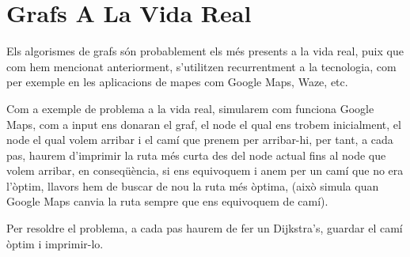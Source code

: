 \section{Grafs A La Vida Real}

Els algorismes de grafs són probablement els més presents a la vida real, puix que com hem mencionat anteriorment, s'utilitzen recurrentment a la tecnologia, com per exemple en les aplicacions de mapes com Google Maps, Waze, etc.

\newline
Com a exemple de problema a la vida real, simularem com funciona Google Maps, com a input ens donaran el graf, el node el qual ens trobem inicialment, el node el qual volem arribar i el camí que prenem per arribar-hi, per tant, a cada pas, haurem d'imprimir la ruta més curta des del node actual fins al node que volem arribar, en conseqüència, si ens equivoquem i anem per un camí que no era l'òptim, llavors hem de buscar de nou la ruta més òptima, (això simula quan Google Maps canvia la ruta sempre que ens equivoquem de camí).

Per resoldre el problema, a cada pas haurem de fer un Dijkstra's, guardar el camí òptim i imprimir-lo.


